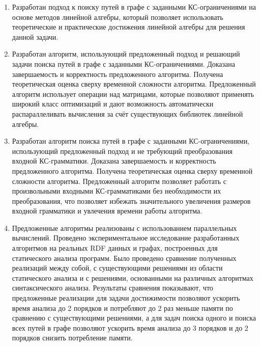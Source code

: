 
\begin{enumerate}[beginpenalty=10000] %
	\item Разработан подход к поиску путей в графе с заданными КС-ограничениями на основе методов линейной алгебры, который позволяет использовать теоретические и практические достижения линейной алгебры для решения данной задачи.
	\item Разработан алгоритм, использующий предложенный подход и решающий задачи поиска путей в графе с заданными КС-ограничениями. Доказана завершаемость и корректность предложенного алгоритма. Получена теоретическая оценка сверху временной сложности алгоритма. Предложенный алгоритм использует операции над матрицами, которые позволяют применять широкий класс оптимизаций и дают возможность автоматически распараллеливать вычисления за счёт существующих библиотек линейной алгебры.
	\item Разработан алгоритм поиска путей в графе с заданными КС-ограничениями, использующий предложенный подход и не требующий преобразования входной КС-грамматики. Доказана завершаемость и корректность предложенного алгоритма. Получена теоретическая оценка сверху временной сложности алгоритма. Предложенный алгоритм позволяет работать с произвольными входными КС-грамматиками без необходимости их преобразования, что позволяет избежать значительного увеличения размеров входной грамматики и увлечения времени работы алгоритма.
	\item Предложенные алгоритмы реализованы с использованием параллельных вычислений. Проведено экспериментальное исследование разработанных алгоритмов на реальных RDF данных и графах, построенных для статического анализа программ. Было проведено сравнение полученных реализаций между собой, с существующими решениями из области статического анализа и с решениями, основанными на различных алгоритмах синтаксического анализа. Результаты сравнения показывают, что предложенные реализации для задачи достижимости позволяют ускорить время анализа до 2 порядков и потребляют до 2 раз меньше памяти по сравнению с существующими решениями, а для задач поиска одного и поиска всех путей в графе позволяют ускорить время анализа до 3 порядков и до 2 порядков снизить потребление памяти.
\end{enumerate}
